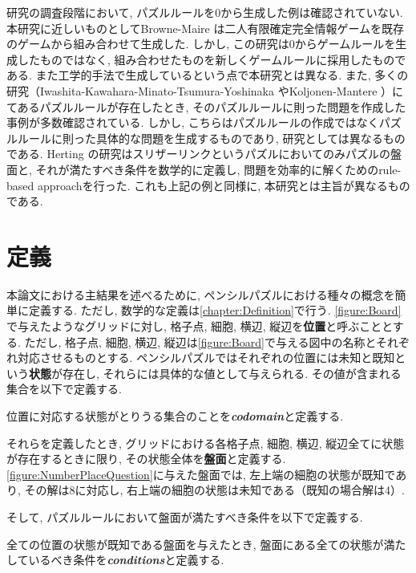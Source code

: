 研究の調査段階において, パズルルールを0から生成した例は確認されていない. 本研究に近しいものとしてBrowne-Maire \cite{Browne2010}は二人有限確定完全情報ゲームを既存のゲームから組み合わせて生成した. しかし, この研究は0からゲームルールを生成したものではなく, 組み合わせたものを新しくゲームルールに採用したものである. また工学的手法で生成しているという点で本研究とは異なる. また, 多くの研究（Iwashita-Kawahara-Minato-Tsumura-Yoshinaka
\cite{Yoshinaka2012}やKoljonen-Mantere \cite{Mantere2007}）にてあるパズルルールが存在したとき, そのパズルルールに則った問題を作成した事例が多数確認されている. しかし, こちらはパズルルールの作成ではなくパズルルールに則った具体的な問題を生成するものであり, 研究としては異なるものである. Herting	 \cite{Herting2004}の研究はスリザーリンクというパズルにおいてのみパズルの盤面と, それが満たすべき条件を数学的に定義し, 問題を効率的に解くためのrule-based approachを行った. これも上記の例と同様に, 本研究とは主旨が異なるものである.



\section{定義}\label{section:IntroDefinition}
本論文における主結果を述べるために, ペンシルパズルにおける種々の概念を簡単に定義する. ただし, 数学的な定義は\cref{chapter:Definition}で行う. \cref{figure:Board}で与えたようなグリッドに対し, 格子点, 細胞, 横辺, 縦辺を\textbf{位置}と呼ぶこととする. ただし, 格子点, 細胞, 横辺, 縦辺は\cref{figure:Board}で与える図中の名称とそれぞれ対応させるものとする. ペンシルパズルではそれぞれの位置には未知と既知という\textbf{状態}が存在し, それらには具体的な値として与えられる. その値が含まれる集合を以下で定義する.
\begin{definition}
  位置に対応する状態がとりうる集合のことを\textbf{\textit{codomain}}と定義する.
\end{definition}
それらを定義したとき, グリッドにおける各格子点, 細胞, 横辺, 縦辺全てに状態が存在するときに限り, その状態全体を\textbf{盤面}と定義する. \cref{figure:NumberPlaceQuestion}に与えた盤面では, 左上端の細胞の状態が既知であり, その解は8に対応し, 右上端の細胞の状態は未知である（既知の場合解は4）.

そして, パズルルールにおいて盤面が満たすべき条件を以下で定義する.
\begin{definition}
  全ての位置の状態が既知である盤面を与えたとき, 盤面にある全ての状態が満たしているべき条件を\textbf{\textit{conditions}}と定義する.
\end{definition}

